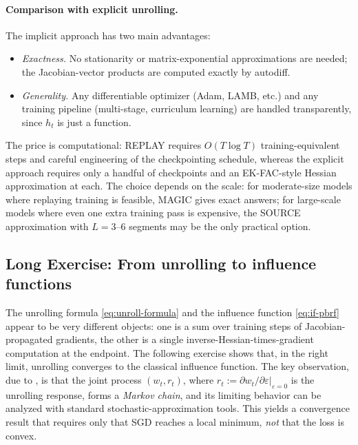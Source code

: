 \documentclass[11pt]{article}
\begin{document}
\paragraph{Comparison with explicit unrolling.} The implicit approach has two main advantages:
\begin{itemize}
  \item \emph{Exactness.} No stationarity or matrix-exponential approximations are needed; the Jacobian-vector products are computed exactly by autodiff.
  \item \emph{Generality.} Any differentiable optimizer (Adam, LAMB, etc.) and any training pipeline (multi-stage, curriculum learning) are handled transparently, since $h_t$ is just a function.
\end{itemize}
The price is computational: REPLAY requires $O(T\log T)$ training-equivalent steps and careful engineering of the checkpointing schedule, whereas the explicit approach requires only a handful of checkpoints and an EK-FAC-style Hessian approximation at each. The choice depends on the scale: for moderate-size models where replaying training is feasible, MAGIC gives exact answers; for large-scale models where even one extra training pass is expensive, the SOURCE approximation with $L = 3$--$6$ segments may be the only practical option.

\subsection{Long Exercise: From unrolling to influence functions}\label{subsec:unroll-to-if}

The unrolling formula \eqref{eq:unroll-formula} and the influence function \eqref{eq:if-pbrf} appear to be very different objects: one is a sum over training steps of Jacobian-propagated gradients, the other is a single inverse-Hessian-times-gradient computation at the endpoint. The following exercise shows that, in the right limit, unrolling converges to the classical influence function. The key observation, due to \citet{mlodozeniec2025distributional}, is that the joint process $(w_t, r_t)$, where $r_t := \partial w_t/\partial\varepsilon\big|_{\varepsilon=0}$ is the unrolling response, forms a \emph{Markov chain}, and its limiting behavior can be analyzed with standard stochastic-approximation tools. This yields a convergence result that requires only that SGD reaches a local minimum, \emph{not} that the loss is convex.
\end{document}
